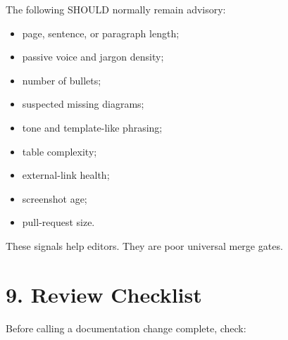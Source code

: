 The following SHOULD normally remain advisory:

\begin{itemize}
\tightlist
\item
  page, sentence, or paragraph length;
\item
  passive voice and jargon density;
\item
  number of bullets;
\item
  suspected missing diagrams;
\item
  tone and template-like phrasing;
\item
  table complexity;
\item
  external-link health;
\item
  screenshot age;
\item
  pull-request size.
\end{itemize}

These signals help editors. They are poor universal merge gates.

\section{9. Review Checklist}\label{record-005-review-checklist}

Before calling a documentation change complete, check:

